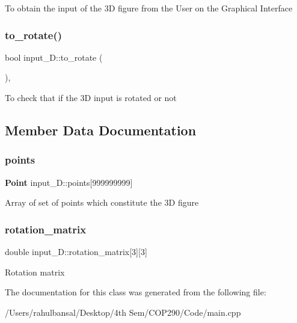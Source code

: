To obtain the input of the 3D figure from the User on the Graphical Interface \mbox{\label{classinput__3_d_ae34b641fad956984a8ee345f6fce2085}} 
\subsubsection{to\+\_\+rotate()}
{\footnotesize\ttfamily bool input\+\_\+D\+::to\+\_\+rotate (\begin{DoxyParamCaption}{ }\end{DoxyParamCaption})\hspace{0.3cm}{\ttfamily [inline]}, {\ttfamily [private]}}

To check that if the 3D input is rotated or not 

\subsection{Member Data Documentation}
\mbox{\label{classinput__3_d_a8f88e5e11f725ac03e8254f4880e3e7f}} 
\subsubsection{points}
{\footnotesize\ttfamily \textbf{ Point} input\+\_\+D\+::points[999999999]\hspace{0.3cm}{\ttfamily [private]}}

Array of set of points which constitute the 3D figure \mbox{\label{classinput__3_d_a97dabc21a8f2162e1a1637e5b0000a88}} 
\subsubsection{rotation\+\_\+matrix}
{\footnotesize\ttfamily double input\+\_\+D\+::rotation\+\_\+matrix[3][3]\hspace{0.3cm}{\ttfamily [private]}}

Rotation matrix 

The documentation for this class was generated from the following file\+:\begin{DoxyCompactItemize}
\item 
/\+Users/rahulbansal/\+Desktop/4th Sem/\+C\+O\+P290/\+Code/main.\+cpp\end{DoxyCompactItemize}
